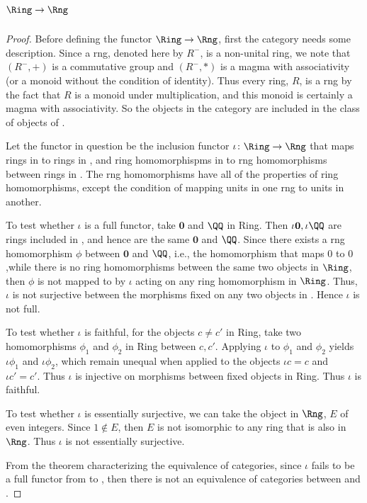 \documentclass[main.tex]{subfiles}
\begin{document}
\subparagraph{\(\Ring\to\Rng\)}
\begin{proof}
	Before defining the functor $\Ring\rightarrow \Rng$, first the category \Rng 
	needs some description. Since a rng, denoted here by $R^-$, is a non-unital 
	ring, we note that $(R^-,+)$ is a commutative group and $(R^-,*)$ is a magma 
	with associativity (or a monoid without the condition of identity). Thus every 
	ring, $R$, is a rng by the fact that $R$ is a monoid under multiplication, and 
	this monoid is certainly a magma with associativity. So the objects in the 
	category \Ring are included in the class of objects of \Rng. 

	Let the functor in question be the inclusion functor $\iota\colon \Ring\rightarrow \Rng$ that maps rings in \Ring to rings in \Rng, and ring homomorphispms in \Ring to rng homomorphisms between rings in \Rng. The rng homomorphisms have all of the properties of ring homomorphisms, except the condition of mapping units in one rng to units in another. 

	To test whether $\iota$ is a full functor, take $\mathbf{0}$ and  $\QQ$ in 
	Ring. Then $\iota \mathbf{0}, \iota \QQ$ are rings included in \Rng, and hence 
	are the same $\mathbf{0}$ and  $\QQ$. Since there exists a rng homomorphism 
	$\phi$ between $\mathbf{0}$ and $\QQ$, i.e., the homomorphism that maps $0$ to 
	$0$,while there is no ring homomorphisms between the same two objects in $\Ring$, then $\phi$ is not mapped to by $\iota$ acting on any ring 
	homomorphism in $\Ring$.  Thus, $\iota$ is not surjective between the 
	morphisms fixed on any two objects in \Ring. Hence $\iota$ is not full.

	To test whether $\iota$ is faithful, for the objects $c \not= c'$ in Ring, take 
	two homomorphisms $\phi_1$ and $\phi_2$ in Ring between $c, c'$. Applying 
	$\iota$ to $\phi_1$ and $\phi_2$ yields $\iota \phi_1$ and $\iota \phi_2$, 
	which remain unequal when applied to the objects $\iota c = c$ and $\iota c' = 
	c'$. Thus $\iota$ is injective on morphisms between fixed objects in Ring. Thus 
	$\iota$ is faithful.

	To test whether $\iota$ is essentially surjective, we can take the object in 
	$\Rng$, $E$ of even integers. Since $1 \notin E$, then $E$ is not 
	isomorphic to any ring that is also in $\Rng$. Thus $\iota$ is not 
	essentially surjective.

	From the theorem characterizing the equivalence of categories, since $\iota$ fails to be a full functor from \Ring to \Rng, then there is not an equivalence of categories between \Ring and \Rng. 


\end{proof}	
\end{document}
